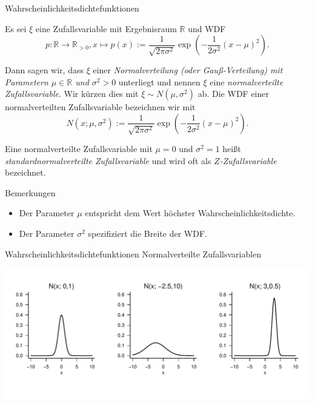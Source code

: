 \documentclass[
  8pt,
  ignorenonframetext,
]{beamer}
\begin{document}
\begin{frame}{Wahrscheinlichkeitsdichtefunktionen}
\protect\hypertarget{wahrscheinlichkeitsdichtefunktionen-1}{}
\small
\begin{definition}
\justifying
Es sei $\xi$ eine Zufallsvariable mit Ergebnisraum  $\mathbb{R}$ und WDF
\begin{equation}
p : \mathbb{R} \to \mathbb{R}_{>0}, x\mapsto p(x)
:= \frac{1}{\sqrt{2\pi \sigma^2}}\exp\left(-\frac{1}{2\sigma^2}(x - \mu)^2\right).
\end{equation}

Dann sagen wir, dass $\xi$ einer \textit{Normalverteilung (oder \textit{Gauß-Verteilung})
mit Parametern $\mu \in \mathbb{R}$ und $\sigma^2 > 0$} unterliegt und nennen $\xi$ eine
\textit{normalverteilte Zufallsvariable}. Wir kürzen dies mit $\xi \sim N\left(\mu,\sigma^2\right)$ ab.
Die WDF einer normalverteilten Zufallsvariable bezeichnen wir mit
\begin{equation}
N\left(x;\mu,\sigma^2\right) := \frac{1}{\sqrt{2\pi \sigma^2}}\exp\left(-\frac{1}{2\sigma^2}(x - \mu)^2\right).
\end{equation}

Eine normalverteilte Zufallsvariable mit $\mu = 0$ und $\sigma^2 = 1$ heißt
\textit{standardnormalverteilte Zufallsvariable} und wird oft als \textit{$Z$-Zufallsvariable} bezeichnet.
\end{definition}

Bemerkungen

\begin{itemize}
\justifying
\item Der Parameter $\mu$ entspricht dem Wert höchster Wahrscheinlichkeitsdichte.
\item Der Parameter $\sigma^2$ spezifiziert die Breite der WDF.
\end{itemize}
\end{frame}

\begin{frame}{Wahrscheinlichkeitsdichtefunktionen}
\protect\hypertarget{wahrscheinlichkeitsdichtefunktionen-2}{}
Normalverteilte Zufallsvariablen \vspace{1cm}

\begin{center}\includegraphics[width=1\linewidth]{4_Abbildungen/wtfi_4_normalverteilung_wdf} \end{center}
\end{frame}
\end{document}
